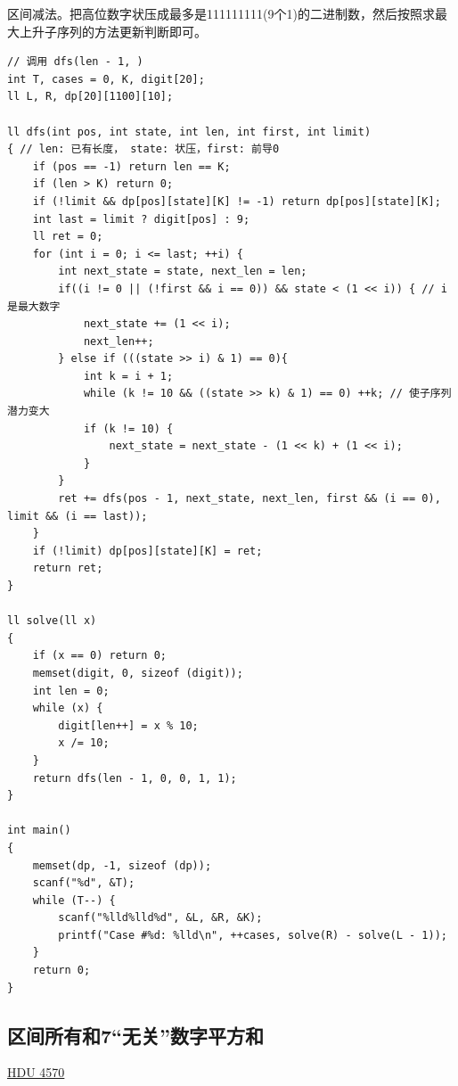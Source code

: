 区间减法。把高位数字状压成最多是111111111(9个1)的二进制数，然后按照求最大上升子序列的方法更新判断即可。
\begin{lstlisting}
// 调用 dfs(len - 1, )
int T, cases = 0, K, digit[20];
ll L, R, dp[20][1100][10];

ll dfs(int pos, int state, int len, int first, int limit)
{ // len: 已有长度， state: 状压，first: 前导0
	if (pos == -1) return len == K;
	if (len > K) return 0;
	if (!limit && dp[pos][state][K] != -1) return dp[pos][state][K];
	int last = limit ? digit[pos] : 9;
	ll ret = 0;
	for (int i = 0; i <= last; ++i) {
		int next_state = state, next_len = len;
		if((i != 0 || (!first && i == 0)) && state < (1 << i)) { // i 是最大数字
			next_state += (1 << i);
			next_len++;
		} else if (((state >> i) & 1) == 0){
			int k = i + 1;
			while (k != 10 && ((state >> k) & 1) == 0) ++k; // 使子序列潜力变大
 			if (k != 10) {
				next_state = next_state - (1 << k) + (1 << i);
			}
		}
		ret += dfs(pos - 1, next_state, next_len, first && (i == 0), limit && (i == last));
	}
	if (!limit) dp[pos][state][K] = ret;
	return ret;
}

ll solve(ll x)
{
	if (x == 0) return 0;
	memset(digit, 0, sizeof (digit));
	int len = 0;
	while (x) {
		digit[len++] = x % 10;
		x /= 10;
	}
	return dfs(len - 1, 0, 0, 1, 1);
}

int main()
{
	memset(dp, -1, sizeof (dp));
	scanf("%d", &T);
	while (T--) {
		scanf("%lld%lld%d", &L, &R, &K);
		printf("Case #%d: %lld\n", ++cases, solve(R) - solve(L - 1));
	}
	return 0;
}
\end{lstlisting}

\subsection{区间所有和7“无关”数字平方和}

\underline {HDU 4570}\\

